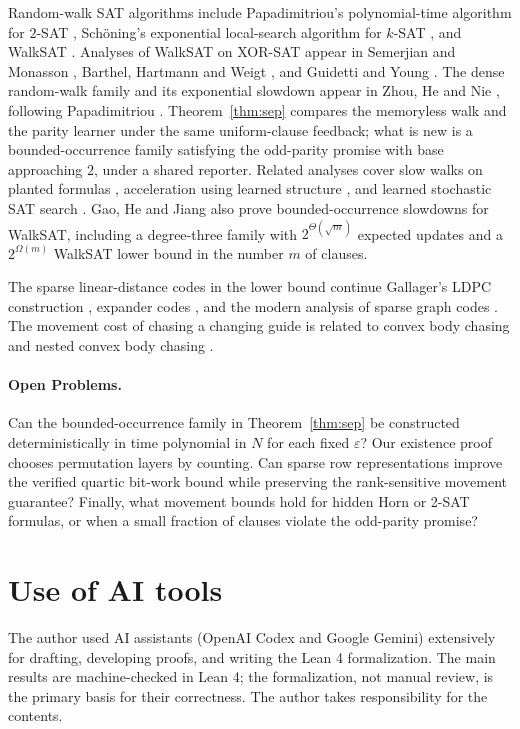\documentclass[11pt,a4paper]{article}
\theoremstyle{definition}
\theoremstyle{remark}
\begin{document}
Random-walk SAT algorithms include Papadimitriou's polynomial-time algorithm for $2$-SAT \cite{papadimitriou1991}, Sch\"oning's exponential local-search algorithm for $k$-SAT \cite{schoning1999}, and WalkSAT \cite{selman1994}. Analyses of WalkSAT on XOR-SAT appear in Semerjian and Monasson \cite{semerjian2003}, Barthel, Hartmann and Weigt \cite{barthel2003}, and Guidetti and Young \cite{guidetti2011}. The dense random-walk family and its exponential slowdown appear in Zhou, He and Nie \cite[Definition~2 and Proposition~2]{zhou2009}, following Papadimitriou \cite{papadimitriou1991}. Theorem~\ref{thm:sep} compares the memoryless walk and the parity learner under the same uniform-clause feedback; what is new is a bounded-occurrence family satisfying the odd-parity promise with base approaching $2$, under a shared reporter. Related analyses cover slow walks on planted formulas \cite{alekhnovich2007}, acceleration using learned structure \cite{wei2002}, and learned stochastic SAT search \cite{kramer2026}. Gao, He and Jiang \cite{gao2026} also prove bounded-occurrence slowdowns for WalkSAT, including a degree-three family with $2^{\Theta(\sqrt{m})}$ expected updates and a $2^{\Omega(m)}$ WalkSAT lower bound in the number $m$ of clauses.

The sparse linear-distance codes in the lower bound continue Gallager's LDPC construction \cite{gallager1962}, expander codes \cite{sipser1996}, and the modern analysis of sparse graph codes \cite{richardson2008}. The movement cost of chasing a changing guide is related to convex body chasing \cite{friedman1993} and nested convex body chasing \cite{bansal2018}.

\paragraph{Open Problems.}
Can the bounded-occurrence family in Theorem~\ref{thm:sep} be constructed deterministically in time polynomial in $N$ for each fixed $\varepsilon$? Our existence proof chooses permutation layers by counting. Can sparse row representations improve the verified quartic bit-work bound while preserving the rank-sensitive movement guarantee? Finally, what movement bounds hold for hidden Horn or 2-SAT formulas, or when a small fraction of clauses violate the odd-parity promise?

\section*{Use of AI tools}
The author used AI assistants (OpenAI Codex and Google Gemini) extensively for drafting, developing proofs, and writing the Lean 4 formalization. The main results are machine-checked in Lean 4; the formalization, not manual review, is the primary basis for their correctness. The author takes responsibility for the contents.
\end{document}
